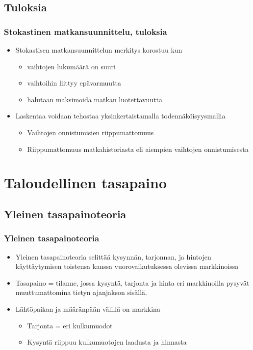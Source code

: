 \documentclass{beamer}
\newcommand*{\secpage}{\usebeamertemplate*{section pages}}
\begin{document}
    \subsection{Tuloksia}
        \begin{frame}
  \frametitle{Stokastinen matkansuunnittelu, tuloksia} 
  \begin{itemize}
   \item 
Stokastisen matkansuunnittelun merkitys korostuu kun 
\begin{itemize}
 \item 
vaihtojen lukumäärä on suuri 
\item
vaihtoihin liittyy epävarmuutta
\item
halutaan maksimoida matkan luotettavuutta
\end{itemize}
\item
Laskentaa voidaan tehostaa yksinkertaistamalla todennäköisyysmallia
\begin{itemize}
 \item 
Vaihtojen onnistumisien riippumattomuus
\item
Riippumattomuus matkahistoriasta eli aiempien vaihtojen onnistumisesta
\end{itemize}
\end{itemize}
    \end{frame}     
    
    
\section{Taloudellinen tasapaino}
\frame{\secpage}


\subsection{Yleinen tasapainoteoria}
\begin{frame}
  \frametitle{Yleinen tasapainoteoria} 
  \begin{itemize}
  \item
  Yleinen tasapainoteoria selittää kysynnän, tarjonnan, ja hintojen käyttäytymisen toistensa kanssa vuorovaikutuksessa
olevissa markkinoissa 
\item
Tasapaino = tilanne, jossa kysyntä, tarjonta ja hinta eri markkinoilla pysyvät muuttumattomina
tietyn ajanjakson sisällä.
\item
Lähtöpaikan ja määränpään välillä on markkina
\begin{itemize}
 \item 
 Tarjonta = eri kulkumuodot
 \item
 Kysyntä riippuu kulkumuotojen laadusta ja hinnasta
 \end{itemize}
   \end{itemize}
    \end{frame}   
    
\end{document}
